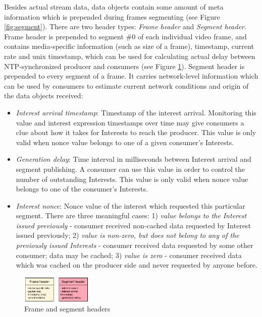 \documentclass{icn/sig-alternate-2012} %
\begin{document}
Besides actual stream data, data objects contain some amount of meta information which is prepended during frames segmenting (see Figure \ref{fig:segment}). There are two header types: \textit{Frame header} and \textit{Segment header}. Frame header is prepended to segment \#0 of each individual video frame, and contains media-specific information (such as size of a frame), timestamp, current rate and unix timestamp, which can be used for calculating actual delay between NTP-synchronized producer and consumers (see Figure \ref{fig:data-struct}). Segment header is prepended to every segment of a frame. It carries network-level information which can be used by consumers to estimate current network conditions and origin of the data objects received:
\begin{itemize} [label={}]

\item \textit{Interest arrival timestamp}: Timestamp of the interest arrival. Monitoring this value and interest expression timestamps over time may give consumers a clue about how it takes for Interests to reach the producer. This value is only valid when nonce value belongs to one of a given consumer's Interests.

\item \textit{Generation delay}: Time interval in milliseconds between Interest arrival and segment publishing. A consumer can use this value in order to control the number of outstanding Interests. This value is only valid when nonce value belongs to one of the consumer's Interests.

\item \textit{Interest nonce}: Nonce value of the interest which requested this particular segment. There are three meaningful cases:  1) \textit{value belongs to the Interest issued previously} - consumer received non-cached data requested by Interest issued previously; 2) \textit{value is non-zero, but does not belong to any of the previously issued Interests} - consumer received data requested by some other consumer; data may be cached; 3) \textit{value is zero} - consumer received data which was cached on the producer side and never requested by anyone before.

\end{itemize}

\begin{figure}[t!]
\centering
\includegraphics[width=0.3\textwidth]{data-struct}
\vspace{-4pt}
\caption{Frame and segment headers}
\label{fig:data-struct}
\end{figure}
\end{document}
